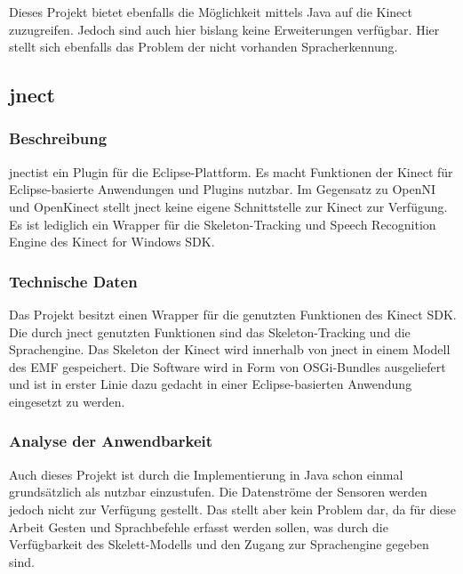 Dieses Projekt bietet ebenfalls die M\"oglichkeit mittels Java auf die Kinect zuzugreifen. Jedoch sind auch hier bislang keine Erweiterungen verf\"ugbar. Hier stellt sich ebenfalls das Problem der nicht vorhanden Spracherkennung.


\subsection{jnect}
\label{subsec:jnect}

\subsubsection{Beschreibung}

jnect\footnotemark[13] ist ein Plugin f\"ur die Eclipse-Plattform. Es macht Funktionen der Kinect f\"ur Eclipse-basierte Anwendungen und Plugins nutzbar. 
Im Gegensatz zu OpenNI und OpenKinect stellt jnect keine eigene Schnittstelle zur Kinect zur Verf\"ugung. Es ist lediglich ein Wrapper f\"ur die Skeleton-Tracking und Speech Recognition Engine des Kinect for Windows SDK\footnotemark[14]. 


\subsubsection{Technische Daten}

Das Projekt besitzt einen Wrapper f\"ur die genutzten Funktionen des Kinect SDK. Die durch jnect genutzten Funktionen sind das Skeleton-Tracking 
und die Sprachengine. Das Skeleton der Kinect wird innerhalb von jnect in einem Modell des \gls{EMF} gespeichert. Die Software wird in Form von OSGi-Bundles ausgeliefert 
und ist in erster Linie dazu gedacht in einer Eclipse-basierten Anwendung eingesetzt zu werden.

\subsubsection{Analyse der Anwendbarkeit}

Auch dieses Projekt ist durch die Implementierung in Java schon einmal grunds\"atzlich als nutzbar einzustufen. Die Datenstr\"ome 
der Sensoren werden jedoch nicht zur Verf\"ugung gestellt. Das stellt aber kein Problem dar, da f\"ur diese Arbeit Gesten und Sprachbefehle 
erfasst werden sollen, was durch die Verf\"ugbarkeit des Skelett-Modells und den Zugang zur Sprachengine gegeben sind.

